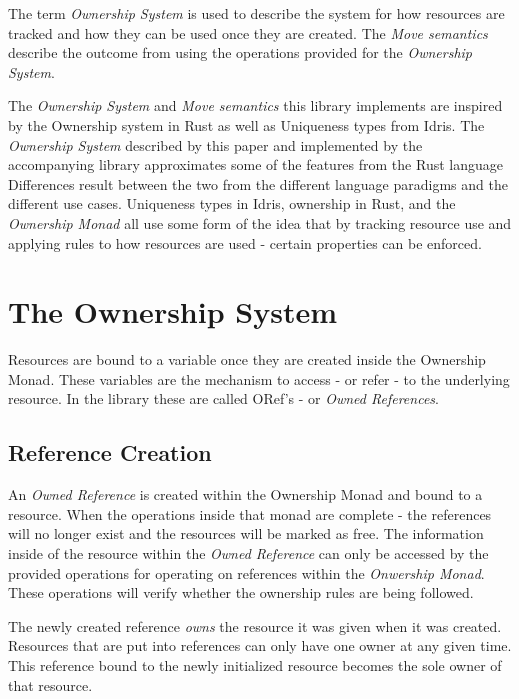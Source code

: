 \documentclass[onehalf,11pt]{beavtex}
\begin{document}
The term \textit{Ownership System} is used to describe the system for how
resources are tracked and how they can be used once they are created.
The \textit{Move semantics} describe the outcome from using the operations provided
for the \textit{Ownership System}.

The \textit{Ownership System} and \textit{Move semantics} this library
implements are inspired by the Ownership system in Rust as well as
Uniqueness types from Idris. \cite{rust_book_ownership} \cite{idris_uniqueness_types}
The \textit{Ownership System} described by this paper and implemented by the
accompanying library approximates some of the features from the Rust language
Differences result between the two from the different language paradigms and
the different use cases. Uniqueness types in Idris, ownership in Rust, and
the \textit{Ownership Monad} all use some form of the idea that by tracking
resource use and applying rules to how resources are used - certain properties
can be enforced.

\section{The Ownership System}

Resources are bound to a variable once they are created inside the Ownership
Monad.  These variables are the mechanism to access - or refer - to the
underlying resource.  In the library these are called ORef's -
or \textit{Owned References}.

\subsection{Reference Creation}

An \textit{Owned Reference} is created within the Ownership Monad and bound to a
resource. When the operations inside that monad are complete - the references
will no longer exist and the resources will be marked as free.
The information inside of the resource within the \textit{Owned Reference} can
only be accessed by the provided operations for operating on references within
the \textit{Onwership Monad}.  These operations will verify whether the
ownership rules are being followed.

The newly created reference \textit{owns} the resource it was given
when it was created. Resources that are put into references can only have one
owner at any given time. This reference bound to the newly initialized resource
becomes the sole owner of that resource.
\end{document}
